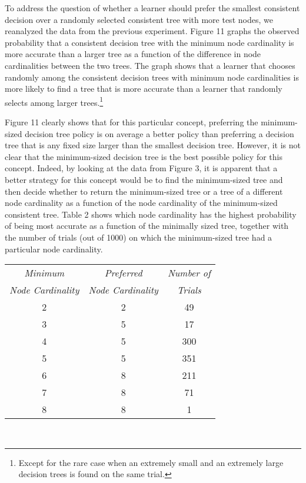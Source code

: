 To address the question of whether a learner should prefer the
smallest consistent decision over a randomly selected consistent tree
with more test nodes, we reanalyzed the data from the previous
experiment.  Figure 11 graphs the observed probability that a
consistent decision tree with the minimum node cardinality is more
accurate than a larger tree as a function of the difference in node
cardinalities between the two trees.  The graph shows that a learner
that chooses randomly among the consistent decision trees with minimum
node cardinalities is more likely to find a tree that is more accurate
than a learner that randomly selects among larger
trees.\footnote{Except for the rare case when an extremely small and an
extremely large decision trees is found on the same trial.}

Figure 11 clearly shows that for this particular concept, preferring
the minimum-sized decision tree policy is on average a better policy
than preferring a decision tree that is any fixed size larger than the
smallest decision tree.  However, it is not clear that the
minimum-sized decision tree is the best possible policy for this
concept.  Indeed, by looking at the data from Figure 3, it is
apparent that a better strategy for this concept would be to find the
minimum-sized tree and then decide whether to return the
minimum-sized tree or a tree of a different node cardinality as a
function of the node cardinality of the minimum-sized consistent tree.
Table 2 shows which node cardinality has the highest
probability of being most accurate as a function of the minimally
sized tree, together with the number of trials (out of 1000) on which
the minimum-sized tree had a particular node cardinality.

\vspace{0.7cm}
\hspace{2.4cm}
\begin{tabular}{||c|c|c||} \hline
{\it Minimum} & {\it Preferred}        & {\it Number of}\\
{\it Node Cardinality}& {\it Node Cardinality} & {\it Trials}\\ \hline
2           &    2                 &   49 \\ \hline
3           &    5                 &   17 \\ \hline
4           &    5                 &  300 \\ \hline
5           &    5                 &  351 \\ \hline
6           &    8                 &  211 \\ \hline
7           &    8                 &   71 \\ \hline
8           &    8                 &    1 \\ \hline
\end{tabular}\\

